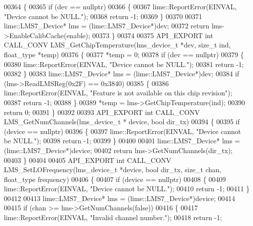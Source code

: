 \begin{DoxyCode}
00364 \{
00365     \textcolor{keywordflow}{if} (dev == \textcolor{keyword}{nullptr})
00366     \{
00367         lime::ReportError(EINVAL, \textcolor{stringliteral}{"Device cannot be NULL."});
00368         \textcolor{keywordflow}{return} -1;
00369     \}
00370 
00371     lime::LMS7_Device* lms = (lime::LMS7_Device*)dev;
00372     \textcolor{keywordflow}{return} lms->EnableCalibCache(enable);
00373 \}
00374 
00375 API_EXPORT \textcolor{keywordtype}{int} CALL_CONV LMS_GetChipTemperature(lms_device_t *dev, \textcolor{keywordtype}{size\_t} ind, 
      float_type *temp)
00376 \{
00377     *temp = 0;
00378     \textcolor{keywordflow}{if} (dev == \textcolor{keyword}{nullptr})
00379     \{
00380         lime::ReportError(EINVAL, \textcolor{stringliteral}{"Device cannot be NULL."});
00381         \textcolor{keywordflow}{return} -1;
00382     \}
00383     lime::LMS7_Device* lms = (lime::LMS7_Device*)dev;
00384     \textcolor{keywordflow}{if} (lms->ReadLMSReg(0x2F) == 0x3840)
00385     \{
00386         lime::ReportError(EINVAL, \textcolor{stringliteral}{"Feature is not available on this chip revision"});
00387         \textcolor{keywordflow}{return} -1;
00388     \}
00389     *temp = lms->GetChipTemperature(ind);
00390     \textcolor{keywordflow}{return} 0;
00391 \}
00392 
00393 API_EXPORT \textcolor{keywordtype}{int} CALL_CONV LMS_GetNumChannels(lms_device_t * device, \textcolor{keywordtype}{bool} dir_tx)
00394 \{
00395     \textcolor{keywordflow}{if} (device == \textcolor{keyword}{nullptr})
00396     \{
00397         lime::ReportError(EINVAL, \textcolor{stringliteral}{"Device cannot be NULL."});
00398         \textcolor{keywordflow}{return} -1;
00399     \}
00400 
00401     lime::LMS7_Device* lms = (lime::LMS7_Device*)device;
00402     \textcolor{keywordflow}{return} lms->GetNumChannels(dir\_tx);
00403 \}
00404 
00405 API_EXPORT \textcolor{keywordtype}{int} CALL_CONV LMS_SetLOFrequency(lms_device_t *device, \textcolor{keywordtype}{bool} dir_tx, \textcolor{keywordtype}{size\_t} 
      chan, float_type frequency)
00406 \{
00407     \textcolor{keywordflow}{if} (device == \textcolor{keyword}{nullptr})
00408     \{
00409         lime::ReportError(EINVAL, \textcolor{stringliteral}{"Device cannot be NULL."});
00410         \textcolor{keywordflow}{return} -1;
00411     \}
00412 
00413     lime::LMS7_Device* lms = (lime::LMS7_Device*)device;
00414 
00415     \textcolor{keywordflow}{if} (chan >= lms->GetNumChannels(\textcolor{keyword}{false}))
00416     \{
00417         lime::ReportError(EINVAL, \textcolor{stringliteral}{"Invalid channel number."});
00418         \textcolor{keywordflow}{return} -1;

\end{DoxyCode}
